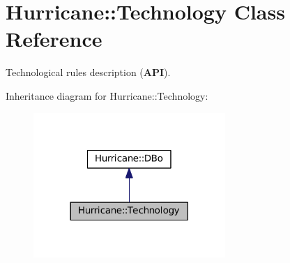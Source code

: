 \hypertarget{classHurricane_1_1Technology}{}\section{Hurricane\+:\+:Technology Class Reference}
\label{classHurricane_1_1Technology}


Technological rules description ({\bfseries A\+PI}).  




Inheritance diagram for Hurricane\+:\+:Technology\+:\nopagebreak
\begin{figure}[H]
\begin{center}
\leavevmode
\includegraphics[width=206pt]{classHurricane_1_1Technology__inherit__graph}
\end{center}
\end{figure}
